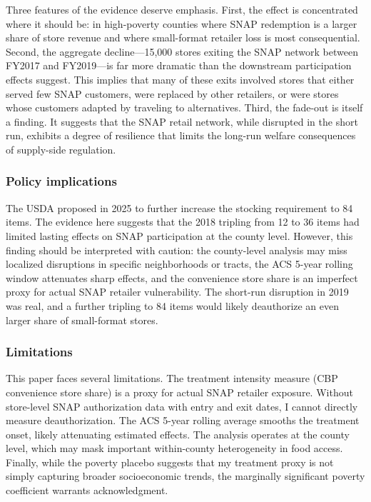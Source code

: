 \documentclass[12pt]{article}
\begin{document}
Three features of the evidence deserve emphasis. First, the effect is concentrated where it should be: in high-poverty counties where SNAP redemption is a larger share of store revenue and where small-format retailer loss is most consequential. Second, the aggregate decline---15,000 stores exiting the SNAP network between FY2017 and FY2019---is far more dramatic than the downstream participation effects suggest. This implies that many of these exits involved stores that either served few SNAP customers, were replaced by other retailers, or were stores whose customers adapted by traveling to alternatives. Third, the fade-out is itself a finding. It suggests that the SNAP retail network, while disrupted in the short run, exhibits a degree of resilience that limits the long-run welfare consequences of supply-side regulation.

\subsubsection*{Policy implications} The USDA proposed in 2025 to further increase the stocking requirement to 84 items. The evidence here suggests that the 2018 tripling from 12 to 36 items had limited lasting effects on SNAP participation at the county level. However, this finding should be interpreted with caution: the county-level analysis may miss localized disruptions in specific neighborhoods or tracts, the ACS 5-year rolling window attenuates sharp effects, and the convenience store share is an imperfect proxy for actual SNAP retailer vulnerability. The short-run disruption in 2019 was real, and a further tripling to 84 items would likely deauthorize an even larger share of small-format stores.

\subsubsection*{Limitations} This paper faces several limitations. The treatment intensity measure (CBP convenience store share) is a proxy for actual SNAP retailer exposure. Without store-level SNAP authorization data with entry and exit dates, I cannot directly measure deauthorization. The ACS 5-year rolling average smooths the treatment onset, likely attenuating estimated effects. The analysis operates at the county level, which may mask important within-county heterogeneity in food access. Finally, while the poverty placebo suggests that my treatment proxy is not simply capturing broader socioeconomic trends, the marginally significant poverty coefficient warrants acknowledgment.
\end{document}
